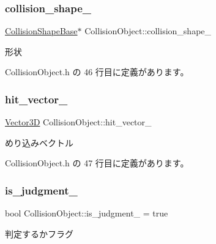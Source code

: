\subsubsection{\texorpdfstring{collision\+\_\+shape\+\_\+}{collision\_shape\_}}
{\footnotesize\ttfamily \mbox{\hyperlink{class_collision_shape_base}{Collision\+Shape\+Base}}$\ast$ Collision\+Object\+::collision\+\_\+shape\+\_\+\hspace{0.3cm}{\ttfamily [private]}}



形状 



 Collision\+Object.\+h の 46 行目に定義があります。

\mbox{\label{class_collision_object_a5fb64c6aaab4606a4e0a1058a844d10e}} 
\subsubsection{\texorpdfstring{hit\+\_\+vector\+\_\+}{hit\_vector\_}}
{\footnotesize\ttfamily \mbox{\hyperlink{class_vector3_d}{Vector3D}} Collision\+Object\+::hit\+\_\+vector\+\_\+\hspace{0.3cm}{\ttfamily [private]}}



めり込みベクトル 



 Collision\+Object.\+h の 47 行目に定義があります。

\mbox{\label{class_collision_object_a0dd29059add616ce619c72ebce6af720}} 
\subsubsection{\texorpdfstring{is\+\_\+judgment\+\_\+}{is\_judgment\_}}
{\footnotesize\ttfamily bool Collision\+Object\+::is\+\_\+judgment\+\_\+ = true\hspace{0.3cm}{\ttfamily [private]}}



判定するかフラグ 



